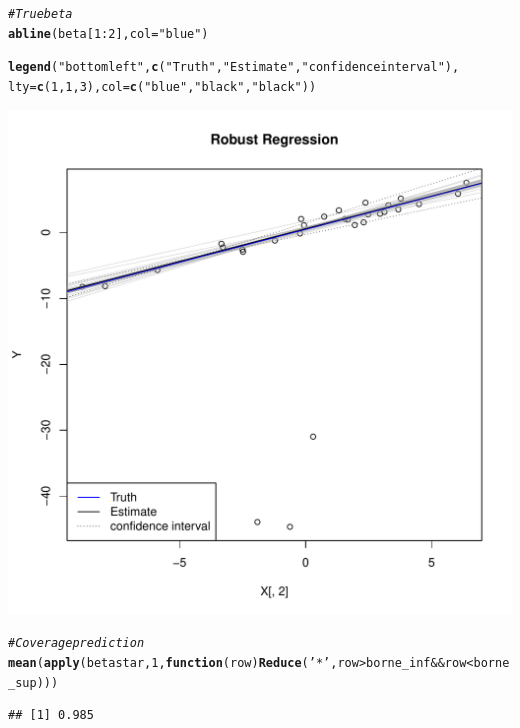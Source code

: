 \documentclass[11pt]{article}\usepackage[]{graphicx}\usepackage[]{color}
\makeatletter
\def\maxwidth{ %
  \ifdim\Gin@nat@width>\linewidth
    \linewidth
  \else
    \Gin@nat@width
  \fi
}
\newcommand{\hlnum}[1]{\textcolor[rgb]{0.686,0.059,0.569}{#1}}%
\newcommand{\hlstr}[1]{\textcolor[rgb]{0.192,0.494,0.8}{#1}}%
\newcommand{\hlcom}[1]{\textcolor[rgb]{0.678,0.584,0.686}{\textit{#1}}}%
\newcommand{\hlopt}[1]{\textcolor[rgb]{0,0,0}{#1}}%
\newcommand{\hlstd}[1]{\textcolor[rgb]{0.345,0.345,0.345}{#1}}%
\newcommand{\hlkwa}[1]{\textcolor[rgb]{0.161,0.373,0.58}{\textbf{#1}}}%
\newcommand{\hlkwc}[1]{\textcolor[rgb]{0.333,0.667,0.333}{#1}}%
\newcommand{\hlkwd}[1]{\textcolor[rgb]{0.737,0.353,0.396}{\textbf{#1}}}%
\newenvironment{kframe}{%
 \def\at@end@of@kframe{}%
 \ifinner\ifhmode%
  \def\at@end@of@kframe{\end{minipage}}%
  \begin{minipage}{\columnwidth}%
 \fi\fi%
 \def\FrameCommand##1{\hskip\@totalleftmargin \hskip-\fboxsep
 \colorbox{shadecolor}{##1}\hskip-\fboxsep
     \hskip-\linewidth \hskip-\@totalleftmargin \hskip\columnwidth}%
 \MakeFramed {\advance\hsize-\width
   \@totalleftmargin\z@ \linewidth\hsize
   \@setminipage}}%
 {\par\unskip\endMakeFramed%
 \at@end@of@kframe}
\newenvironment{knitrout}{}{} %
\makeatother
\begin{document}
\begin{knitrout}
\begin{kframe}
\begin{alltt}
\hlcom{# True beta}
\hlkwd{abline}\hlstd{(beta[}\hlnum{1}\hlopt{:}\hlnum{2}\hlstd{],}\hlkwc{col}\hlstd{=}\hlstr{"blue"}\hlstd{)}

\hlkwd{legend}\hlstd{(}\hlstr{"bottomleft"}\hlstd{,}\hlkwd{c}\hlstd{(}\hlstr{"Truth"}\hlstd{,}\hlstr{"Estimate"}\hlstd{,}\hlstr{"confidence interval"}\hlstd{),}
       \hlkwc{lty}\hlstd{=}\hlkwd{c}\hlstd{(}\hlnum{1}\hlstd{,}\hlnum{1}\hlstd{,}\hlnum{3}\hlstd{),}\hlkwc{col}\hlstd{=}\hlkwd{c}\hlstd{(}\hlstr{"blue"}\hlstd{,}\hlstr{"black"}\hlstd{,}\hlstr{"black"}\hlstd{))}
\end{alltt}
\end{kframe}
\includegraphics[width=\maxwidth]{figure/unnamed-chunk-3-1} 
\begin{kframe}\begin{alltt}
\hlcom{# Coverage prediction}
\hlkwd{mean}\hlstd{(}\hlkwd{apply}\hlstd{(betastar,}\hlnum{1}\hlstd{,}\hlkwa{function}\hlstd{(}\hlkwc{row}\hlstd{)} \hlkwd{Reduce}\hlstd{(}\hlstr{'*'}\hlstd{,row}\hlopt{>}\hlstd{borne_inf} \hlopt{&&} \hlstd{row}\hlopt{<}\hlstd{borne_sup)))}
\end{alltt}
\begin{verbatim}
## [1] 0.985
\end{verbatim}
\end{kframe}
\end{knitrout}
\end{document}
